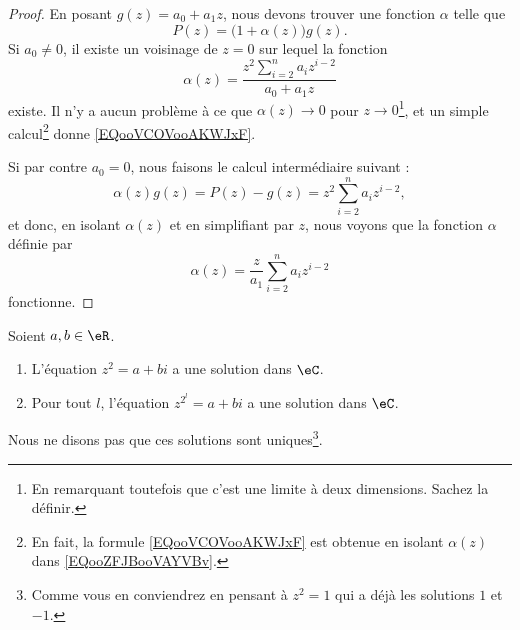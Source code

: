 \begin{proof}
    En posant \( g(z)=a_0+a_1z\), nous devons trouver une fonction \( \alpha\) telle que
    \begin{equation}        \label{EQooZFJBooVAYVBv}
        P(z)=\big( 1+\alpha(z) \big)g(z).
    \end{equation}
    Si \( a_0\neq 0\), il existe un voisinage de \( z=0\) sur lequel la fonction
    \begin{equation}        \label{EQooVCOVooAKWJxF}
        \alpha(z)=\frac{ z^2\sum_{i=2}^na_iz^{i-2} }{ a_0+a_1z }
    \end{equation}
    existe. Il n'y a aucun problème à ce que \( \alpha(z)\to 0\) pour \( z\to 0\)\footnote{En remarquant toutefois que c'est une limite à deux dimensions. Sachez la définir.}, et un simple calcul\footnote{En fait, la formule \eqref{EQooVCOVooAKWJxF} est obtenue en isolant \( \alpha(z)\) dans \eqref{EQooZFJBooVAYVBv}.} donne \eqref{EQooVCOVooAKWJxF}.

    Si par contre \( a_0=0\), nous faisons le calcul intermédiaire suivant :
    \begin{equation}
        \alpha(z)g(z)=P(z)-g(z)=z^2\sum_{i=2}^na_iz^{i-2},
    \end{equation}
    et donc, en isolant \( \alpha(z)\) et en simplifiant par \( z\), nous voyons que la fonction \( \alpha\) définie par
    \begin{equation}
        \alpha(z)=\frac{z}{ a_1 }\sum_{i=2}^na_iz^{i-2}
    \end{equation}
    fonctionne.
\end{proof}

\begin{proposition}       \label{PROPooLBBLooQwEiHr}
    Soient \( a,b\in \eR\).
    \begin{enumerate}
        \item       \label{ITEMooSPSWooKLtqzZ}
            L'équation \( z^2=a+bi\) a une solution dans \( \eC\).
        \item       \label{ITEMooQOJDooWjfGXv}
            Pour tout \( l\), l'équation \( z^{2^l}=a+bi\) a une solution dans \( \eC\).
    \end{enumerate}
    Nous ne disons pas que ces solutions sont uniques\footnote{Comme vous en conviendrez en pensant à \( z^2=1\) qui a déjà les solutions \( 1\) et \( -1\).}.
\end{proposition}


